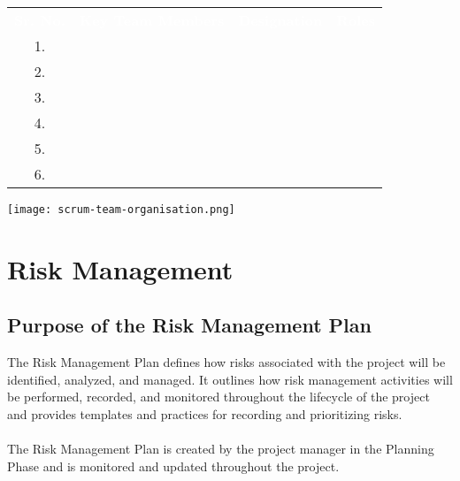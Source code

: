 \documentclass[a4paper]{article}
\begin{document}
	\begin{center}
		
		
		{
			\setlength{\extrarowheight}{2pt}
			
			\newcolumntype{b}{X}
			
			
			\begin{tabularx}{\textwidth}{ c X X X }
				
				\rowcolor{levelfirst}
				
				{ \textbf{\textcolor{white}{Sr. No.}}} & {\textbf{\textcolor{white}{Key Team Members \newline}}} & {\textbf{\textcolor{white}{Designation}}} & {\textbf{\textcolor{white}{Roles}}} \\
				
				
				1. &  &  &   \\
				
				2. & & &  \\
				
				3. & & &  \\
				
				4. & & &  \\
		
				5. & & &  \\
				
				6. & & &  \\
				
				
				
				
			\end{tabularx}
				
		}\par
		\bigskip
		\bigskip
		\bigskip
		\texttt{[image: scrum-team-organisation.png]}\\[-1em]
	\end{center}
    
    \newpage
    
    \section{Risk Management}
    
    \subsection{Purpose of the Risk Management Plan}
    The Risk Management Plan defines how risks associated with the  project will be identified, analyzed, and managed. It outlines how risk management activities will be performed, recorded, and monitored throughout the lifecycle of the project and provides templates and practices for recording and prioritizing risks.\\ \\
    The Risk Management Plan is created by the project manager in the Planning Phase and is monitored and updated throughout the project.
    
\end{document}
